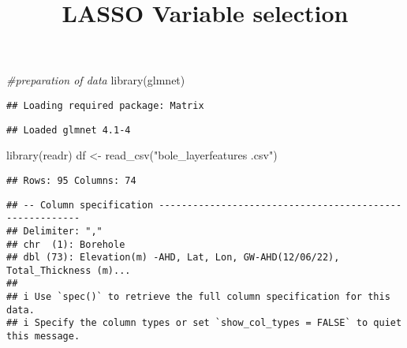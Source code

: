 \documentclass[
]{article}
\title{LASSO Variable selection}
\author{}
\date{\vspace{-2.5em}}
\newenvironment{Shaded}{\begin{snugshade}}{\end{snugshade}}
\newcommand{\CommentTok}[1]{\textcolor[rgb]{0.56,0.35,0.01}{\textit{#1}}}
\newcommand{\DecValTok}[1]{\textcolor[rgb]{0.00,0.00,0.81}{#1}}
\newcommand{\FunctionTok}[1]{\textcolor[rgb]{0.00,0.00,0.00}{#1}}
\newcommand{\NormalTok}[1]{#1}
\newcommand{\OtherTok}[1]{\textcolor[rgb]{0.56,0.35,0.01}{#1}}
\newcommand{\SpecialCharTok}[1]{\textcolor[rgb]{0.00,0.00,0.00}{#1}}
\newcommand{\StringTok}[1]{\textcolor[rgb]{0.31,0.60,0.02}{#1}}
\begin{document}
\maketitle

\begin{Shaded}
\begin{Highlighting}[]
\CommentTok{\#preparation of data}
\FunctionTok{library}\NormalTok{(glmnet)}
\end{Highlighting}
\end{Shaded}

\begin{verbatim}
## Loading required package: Matrix
\end{verbatim}

\begin{verbatim}
## Loaded glmnet 4.1-4
\end{verbatim}

\begin{Shaded}
\begin{Highlighting}[]
\FunctionTok{library}\NormalTok{(readr)}
\NormalTok{df }\OtherTok{\textless{}{-}} \FunctionTok{read\_csv}\NormalTok{(}\StringTok{"bole\_layerfeatures .csv"}\NormalTok{)}
\end{Highlighting}
\end{Shaded}

\begin{verbatim}
## Rows: 95 Columns: 74
\end{verbatim}

\begin{verbatim}
## -- Column specification --------------------------------------------------------
## Delimiter: ","
## chr  (1): Borehole
## dbl (73): Elevation(m) -AHD, Lat, Lon, GW-AHD(12/06/22), Total_Thickness (m)...
## 
## i Use `spec()` to retrieve the full column specification for this data.
## i Specify the column types or set `show_col_types = FALSE` to quiet this message.
\end{verbatim}

\begin{Shaded}
\end{Shaded}
\end{document}
